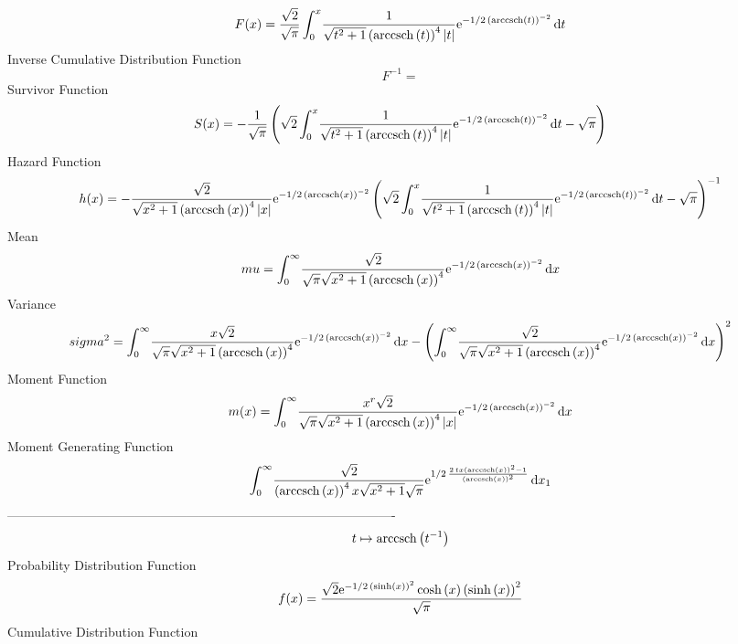 \documentclass[12pt]{article}
\begin{document}
 $$F(x)={\frac {\sqrt {2}}{\sqrt {\pi}}\int_{0}^{x}\!{\frac {1}{\sqrt {{t}^{2}
+1} \left( {\rm arccsch} \left(t\right) \right) ^{4} \left| t \right| 
}{{\rm e}^{-1/2\, \left( {\rm arccsch} \left(t\right) \right) ^{-2}}}}
\,{\rm d}t}
$$ Inverse Cumulative Distribution Function 
  $$F^{-1} = $$Survivor Function 
 $$ S(x)=-{\frac {1}{\sqrt {\pi}} \left( \sqrt {2}\int_{0}^{x}\!{\frac {1}{
\sqrt {{t}^{2}+1} \left( {\rm arccsch} \left(t\right) \right) ^{4}
 \left| t \right| }{{\rm e}^{-1/2\, \left( {\rm arccsch} \left(t
\right) \right) ^{-2}}}}\,{\rm d}t-\sqrt {\pi} \right) }
$$ Hazard Function 
 $$ h(x)=-{\frac {\sqrt {2}}{\sqrt {{x}^{2}+1} \left( {\rm arccsch} \left(x
\right) \right) ^{4} \left| x \right| }{{\rm e}^{-1/2\, \left( 
{\rm arccsch} \left(x\right) \right) ^{-2}}} \left( \sqrt {2}\int_{0}^
{x}\!{\frac {1}{\sqrt {{t}^{2}+1} \left( {\rm arccsch} \left(t\right)
 \right) ^{4} \left| t \right| }{{\rm e}^{-1/2\, \left( {\rm arccsch} 
\left(t\right) \right) ^{-2}}}}\,{\rm d}t-\sqrt {\pi} \right) ^{-1}}
$$Mean 
 $$ mu=\int_{0}^{\infty }\!{\frac {\sqrt {2}}{\sqrt {\pi}\sqrt {{x}^{2}+1}
 \left( {\rm arccsch} \left(x\right) \right) ^{4}}{{\rm e}^{-1/2\,
 \left( {\rm arccsch} \left(x\right) \right) ^{-2}}}}\,{\rm d}x
$$ Variance 
 $$ sigma^2 = \int_{0}^{\infty }\!{\frac {x\sqrt {2}}{\sqrt {\pi}\sqrt {{x}^{2}+1}
 \left( {\rm arccsch} \left(x\right) \right) ^{4}}{{\rm e}^{-1/2\,
 \left( {\rm arccsch} \left(x\right) \right) ^{-2}}}}\,{\rm d}x-
 \left( \int_{0}^{\infty }\!{\frac {\sqrt {2}}{\sqrt {\pi}\sqrt {{x}^{
2}+1} \left( {\rm arccsch} \left(x\right) \right) ^{4}}{{\rm e}^{-1/2
\, \left( {\rm arccsch} \left(x\right) \right) ^{-2}}}}\,{\rm d}x
 \right) ^{2}
$$Moment Function 
 $$ m(x) = \int_{0}^{\infty }\!{\frac {{x}^{r}\sqrt {2}}{\sqrt {\pi}\sqrt {{x}^{2
}+1} \left( {\rm arccsch} \left(x\right) \right) ^{4} \left| x
 \right| }{{\rm e}^{-1/2\, \left( {\rm arccsch} \left(x\right)
 \right) ^{-2}}}}\,{\rm d}x
$$ Moment Generating Function 
 $$\int_{0}^{\infty }\!{\frac {\sqrt {2}}{ \left( {\rm arccsch} \left(x
\right) \right) ^{4}x\sqrt {{x}^{2}+1}\sqrt {\pi}}{{\rm e}^{1/2\,{
\frac {2\,tx \left( {\rm arccsch} \left(x\right) \right) ^{2}-1}{
 \left( {\rm arccsch} \left(x\right) \right) ^{2}}}}}}\,{\rm d}x_{{1}}
$$-------------------------------------------------------------------------------------------  \\$$t\mapsto {\rm arccsch} \left({t}^{-1}\right)
$$Probability Distribution Function 
$$  f(x)={\frac {\sqrt {2}{{\rm e}^{-1/2\, \left( \sinh \left( x \right) 
 \right) ^{2}}}\cosh \left( x \right)  \left( \sinh \left( x \right) 
 \right) ^{2}}{\sqrt {\pi}}}
$$Cumulative Distribution Function  
\end{document}
